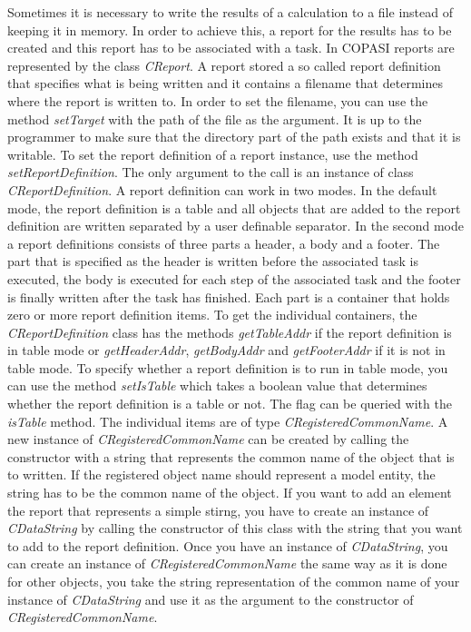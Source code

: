 \documentclass[a4,10pt]{article}
\begin{document}
Sometimes it is necessary to write the results of a calculation to a file instead of keeping it in memory. In order to achieve this, a report for the results has to be created and this report has to be associated with a task.
In COPASI reports are represented by the class \textit{CReport}. A report stored a so called report definition that specifies what is being written and it contains a filename that determines where the report is written to.
In order to set the filename, you can use the method \textit{setTarget} with the path of the file as the argument. It is up to the programmer to make sure that the directory part of the path exists and that it is writable.
To set the report definition of a report instance, use the method \textit{setReportDefinition}. The only argument to the call is an instance of class \textit{CReportDefinition}.
A report definition can work in two modes. In the default mode, the report definition is a table and all objects that are added to the report definition are written separated by a user definable separator.
In the second mode a report definitions consists of three parts a header, a body and a footer. The part that is specified as the header is written before the associated task is executed, the body is executed for each step of the associated task and the footer is finally written after the task has finished.
Each part is a container that holds zero or more report definition items. To get the individual containers, the \textit{CReportDefinition} class has the methods \textit{getTableAddr} if the report definition is in table mode or \textit{getHeaderAddr}, \textit{getBodyAddr} and \textit{getFooterAddr} if it is not in table mode.
To specify whether a report definition is to run in table mode, you can use the method \textit{setIsTable} which takes a boolean value that determines whether the report definition is a table or not. The flag can be queried with the \textit{isTable} method.
The individual items are of type \textit{CRegisteredCommonName}. A new instance of \textit{CRegisteredCommonName} can be created by calling the constructor with a string that represents the common name of the object that is to written.
If the registered object name should represent a model entity, the string has to be the common name of the object. If you want to add an element the report that represents a simple stirng, you have to create an instance of \textit{CDataString} by calling the constructor of this class with the string that you want to add to the report definition. Once you have an instance of \textit{CDataString}, you can create an instance of \textit{CRegisteredCommonName} the same way as it is done for other objects, you take the string representation of the common name of your instance of \textit{CDataString} and use it as the argument to the constructor of \textit{CRegisteredCommonName}.
\end{document}
